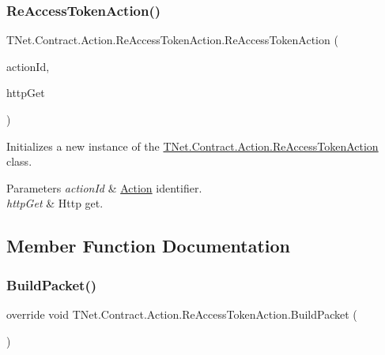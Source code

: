 \subsubsection{\texorpdfstring{Re\+Access\+Token\+Action()}{ReAccessTokenAction()}}
{\footnotesize\ttfamily T\+Net.\+Contract.\+Action.\+Re\+Access\+Token\+Action.\+Re\+Access\+Token\+Action (\begin{DoxyParamCaption}\item[{short}]{action\+Id,  }\item[{\mbox{\hyperlink{class_t_net_1_1_service_1_1_action_getter}{Action\+Getter}}}]{http\+Get }\end{DoxyParamCaption})\hspace{0.3cm}{\ttfamily [protected]}}



Initializes a new instance of the \mbox{\hyperlink{class_t_net_1_1_contract_1_1_action_1_1_re_access_token_action}{T\+Net.\+Contract.\+Action.\+Re\+Access\+Token\+Action}} class. 


\begin{DoxyParams}{Parameters}
{\em action\+Id} & \mbox{\hyperlink{namespace_t_net_1_1_contract_1_1_action}{Action}} identifier.\\
\hline
{\em http\+Get} & Http get.\\
\hline
\end{DoxyParams}


\subsection{Member Function Documentation}
\mbox{\label{class_t_net_1_1_contract_1_1_action_1_1_re_access_token_action_a722f628b8496ce0561bc0f190657d46f}} 
\subsubsection{\texorpdfstring{Build\+Packet()}{BuildPacket()}}
{\footnotesize\ttfamily override void T\+Net.\+Contract.\+Action.\+Re\+Access\+Token\+Action.\+Build\+Packet (\begin{DoxyParamCaption}{ }\end{DoxyParamCaption})\hspace{0.3cm}{\ttfamily [virtual]}}



